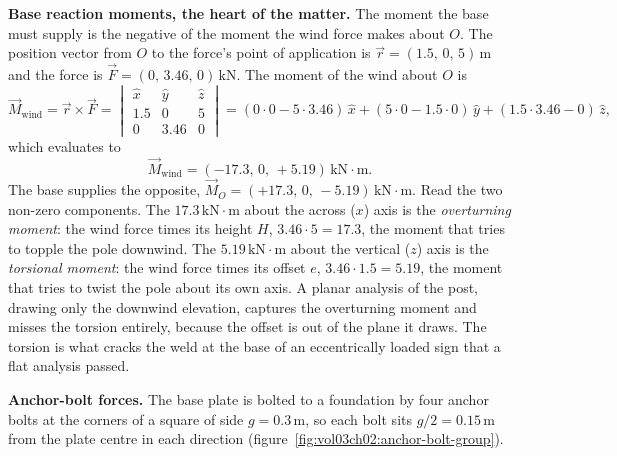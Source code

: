 \textbf{Base reaction moments, the heart of the matter.} The moment the base
must supply is the negative of the moment the wind force makes about $O$. The
position vector from $O$ to the force's point of application is
$\vec{r} = (1.5,\,0,\,5)\,\si{\meter}$ and the force is
$\vec{F} = (0,\,3.46,\,0)\,\text{kN}$. The moment of the wind about $O$ is
\[
\vec{M}_{\text{wind}} = \vec{r} \times \vec{F}
= \begin{vmatrix}
\hat{x} & \hat{y} & \hat{z} \\
1.5 & 0 & 5 \\
0 & 3.46 & 0
\end{vmatrix}
= (0\cdot 0 - 5\cdot 3.46)\,\hat{x}
+ (5\cdot 0 - 1.5\cdot 0)\,\hat{y}
+ (1.5\cdot 3.46 - 0)\,\hat{z},
\]
which evaluates to
\[
\vec{M}_{\text{wind}} = (-17.3,\, 0,\, +5.19)\,\text{kN}\cdot\text{m}.
\]
The base supplies the opposite, $\vec{M}_O = (+17.3,\, 0,\, -5.19)\,\text{kN}
\cdot\text{m}$. Read the two non-zero components. The
$17.3\,\text{kN}\cdot\text{m}$ about the across ($x$) axis is the
\emph{overturning moment}: the wind force times its height $H$,
$3.46 \cdot 5 = 17.3$, the moment that tries to topple the pole downwind. The
$5.19\,\text{kN}\cdot\text{m}$ about the vertical ($z$) axis is the
\emph{torsional moment}: the wind force times its offset $e$,
$3.46 \cdot 1.5 = 5.19$, the moment that tries to twist the pole about its own
axis. A planar analysis of the post, drawing only the downwind elevation,
captures the overturning moment and misses the torsion entirely, because the
offset is out of the plane it draws. The torsion is what cracks the weld at the
base of an eccentrically loaded sign that a flat analysis passed.

\textbf{Anchor-bolt forces.} The base plate is bolted to a foundation by four
anchor bolts at the corners of a square of side $g = 0.3\,\si{\meter}$, so each
bolt sits $g/2 = 0.15\,\si{\meter}$ from the plate centre in each direction
(figure~\ref{fig:vol03ch02:anchor-bolt-group}).



